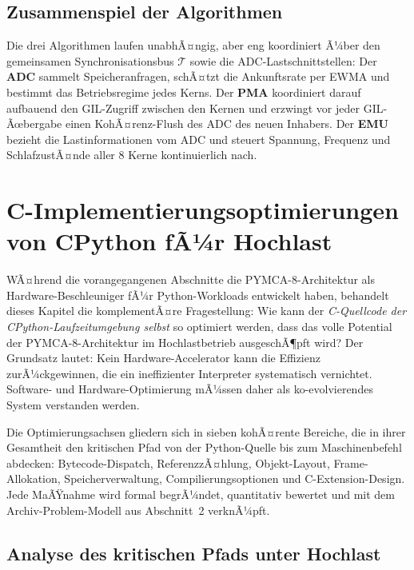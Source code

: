 ﻿\documentclass[a4paper,12pt]{scrreprt}
\theoremstyle{definition}
\begin{document}
	\subsection{Zusammenspiel der Algorithmen}

	Die drei Algorithmen laufen unabhÃ¤ngig, aber eng koordiniert Ã¼ber den gemeinsamen
	Synchronisationsbus $\mathcal{T}$ sowie die ADC-Lastschnittstellen:
	Der \textbf{ADC} sammelt Speicheranfragen, schÃ¤tzt die Ankunftsrate per EWMA und bestimmt
	das Betriebsregime jedes Kerns.
	Der \textbf{PMA} koordiniert darauf aufbauend den GIL-Zugriff zwischen den Kernen und
	erzwingt vor jeder GIL-Ãœbergabe einen KohÃ¤renz-Flush des ADC des neuen Inhabers.
	Der \textbf{EMU} bezieht die Lastinformationen vom ADC und steuert Spannung, Frequenz
	und SchlafzustÃ¤nde aller 8 Kerne kontinuierlich nach.

	\section{C-Implementierungsoptimierungen von CPython fÃ¼r Hochlast}
	\label{sec:coptimization}
	
	WÃ¤hrend die vorangegangenen Abschnitte die PYMCA-8-Architektur als
	Hardware-Beschleuniger fÃ¼r Python-Workloads entwickelt haben, behandelt
	dieses Kapitel die komplementÃ¤re Fragestellung: Wie kann der
	\emph{C-Quellcode der CPython-Laufzeitumgebung selbst} so optimiert
	werden, dass das volle Potential der PYMCA-8-Architektur im Hochlastbetrieb
	ausgeschÃ¶pft wird? Der Grundsatz lautet: Kein Hardware-Accelerator kann
	die Effizienz zurÃ¼ckgewinnen, die ein ineffizienter Interpreter
	systematisch vernichtet. Software- und Hardware-Optimierung mÃ¼ssen daher
	als ko-evolvierendes System verstanden werden.
	
	Die Optimierungsachsen gliedern sich in sieben kohÃ¤rente Bereiche,
	die in ihrer Gesamtheit den kritischen Pfad von der Python-Quelle bis
	zum Maschinenbefehl abdecken: Bytecode-Dispatch, ReferenzzÃ¤hlung,
	Objekt-Layout, Frame-Allokation, Speicherverwaltung, Compilierungsoptionen
	und C-Extension-Design. Jede MaÃŸnahme wird formal begrÃ¼ndet, quantitativ
	bewertet und mit dem Archiv-Problem-Modell aus Abschnitt~2 verknÃ¼pft.
	
	\subsection{Analyse des kritischen Pfads unter Hochlast}
	
\end{document}
